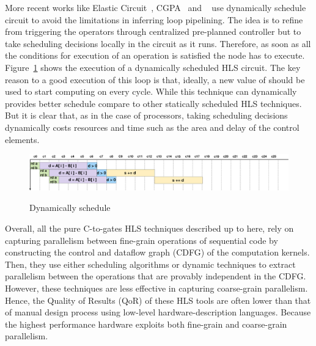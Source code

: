 More recent works like Elastic Circuit~\cite{elasticCircuit, elasticFlow}, CGPA~\cite{cgpa} and ~\cite{josipovic_fpga_2018_dynamically} use dynamically schedule circuit to avoid the limitations in inferring loop pipelining.
The idea is to refine from triggering the operators through centralized pre-planned controller but to take scheduling decisions locally in the circuit as it runs.
Therefore, as soon as all the conditions for execution of an operation is satisfied the node has to execute.
Figure~\ref{fig:dynamic_schedule} shows the execution of a dynamically scheduled HLS circuit.
The key reason to a good execution of this loop is that, ideally, a new value of  should be used to start computing  on every cycle.
While this technique can dynamically provides better schedule compare to other statically scheduled HLS techniques.
But it is clear that, as in the case of processors, taking scheduling decisions dynamically costs resources and time such as the area and delay of the control elements.

\begin{figure}[!h]
    \centering
    \includegraphics[width=1\textwidth]{figures/Introduction/schedule_dynamic.pdf}
    \label{fig:dynamic_schedule}
    \caption{Dynamically schedule}
\end{figure}  

Overall, all the pure C-to-gates HLS techniques described up to here, rely on capturing parallelism between fine-grain operations of sequential code by constructing the control and dataflow graph (CDFG) of the computation kernels.
Then, they use either scheduling algorithms or dynamic techniques to extract parallelism between the operations that are provably independent in the CDFG.
However, these techniques are less effective in capturing coarse-grain parallelism.
Hence, the Quality of Results (QoR) of these HLS tools are often lower than that of manual design process using low-level hardware-description languages.
Because the highest performance hardware exploits both fine-grain and coarse-grain parallelism.

